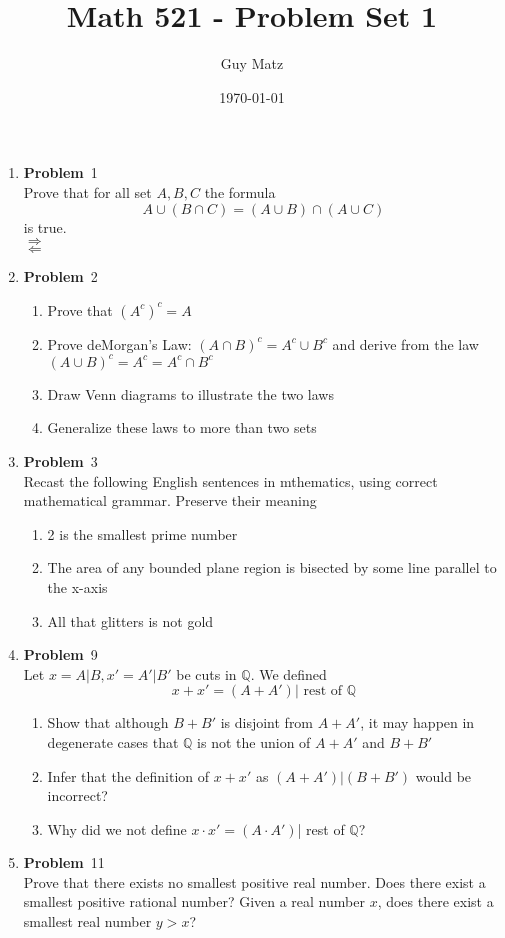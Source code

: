 \documentclass[12pt]{amsart}
\title{\textbf{Math 521 - Problem Set 1}}
\author{Guy Matz}
\date{\today}
\newcommand{\benu}{\begin{enumerate}}
\newcommand{\eenu}{\end{enumerate}}
\theoremstyle{definition}
\newcommand{\mbQ}{\mathbb{Q}}
\newcommand{\itep}{\item {\bfseries Problem}\ }
\begin{document}
 

\maketitle
\newpage %

\begin{enumerate}[series=p]
\itep 1
\\
Prove that for all set $A, B, C$ the formula
$$A \cup (B \cap C) = (A \cup B) \cap (A \cup C)$$
is true.
\\
$\Rightarrow$ 
\\
$\Leftarrow$
\newpage %

\itep 2
\benu
\item Prove that $(A^c)^c = A$

\item Prove deMorgan's Law: $(A \cap B)^c = A^c \cup B^c$ and derive from the law $(A \cup B)^c = A^c = A^c \cap B^c$

\item Draw Venn diagrams to illustrate the two laws

\item Generalize these laws to more than two sets

\eenu 

\newpage

\itep 3\\
Recast the following English sentences in mthematics, using correct mathematical grammar.  Preserve their meaning
\\
\benu
\item 2 is the smallest prime number
\item The area of any bounded plane region is bisected by some line parallel to the x-axis
\item All that glitters is not gold
\eenu
\newpage

\itep 9\\
Let $x = A|B, x' = A'|B'$ be cuts in $\mbQ$.  We defined
$$x + x' = (A + A')|\text{ rest of } \mbQ$$
\benu
\item Show that although $B + B'$ is disjoint from $A + A'$, it may happen in degenerate cases that $\mbQ$ is not the union of $A + A'$ and $B + B'$
\item Infer that the definition of $x + x'$ as $(A + A')|(B + B')$ would be incorrect?
\item Why did we not define $x \cdot x' = (A \cdot A')$| rest of $\mbQ$?
\eenu

\newpage
\itep 11\\
Prove that there exists no smallest positive real number.  Does there exist a smallest positive rational number?  Given a real number $x$, does there exist a smallest real number $y > x$?


\end{enumerate}
\end{document}
